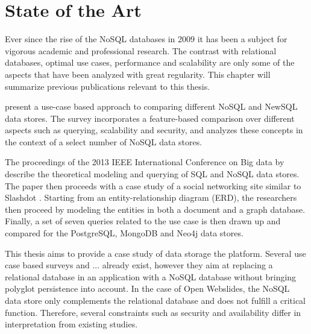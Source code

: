 \chapter{State of the Art}
\label{ch:state-of-the-art}

Ever since the rise of the NoSQL databases in 2009 \autocite{Sadalage2012} it has been a subject for vigorous academic and professional research. The contrast with relational databases, optimal use cases, performance and scalability are only some of the aspects that have been analyzed with great regularity. This chapter will summarize previous publications relevant to this thesis.


\textcite{Grolinger2013} present a use-case based approach to comparing different NoSQL and NewSQL data stores. The survey incorporates a feature-based comparison over different aspects such as querying, scalability and security, and analyzes these concepts in the context of a select number of NoSQL data stores.

The proceedings of the 2013 IEEE International Conference on Big data by \textcite{Kaur2013} describe the theoretical modeling and querying of SQL and NoSQL data stores. The paper then proceeds with a case study of a social networking site similar to Slashdot \autocite{Malda1997}. Starting from an entity-relationship diagram (ERD), the researchers then proceed by modeling the entities in both a document and a graph database. Finally, a set of seven queries related to the use case is then drawn up and compared for the PostgreSQL, MongoDB and Neo4j data stores.


This thesis aims to provide a case study of data storage the \textcite{OpenWebslides2017} platform. Several use case based surveys and ... already exist, however they aim at replacing a relational database in an application with a NoSQL database without bringing polyglot persistence into account. In the case of Open Webslides, the NoSQL data store only complements the relational database and does not fulfill a critical function. Therefore, several constraints such as security and availability differ in interpretation from existing studies.
